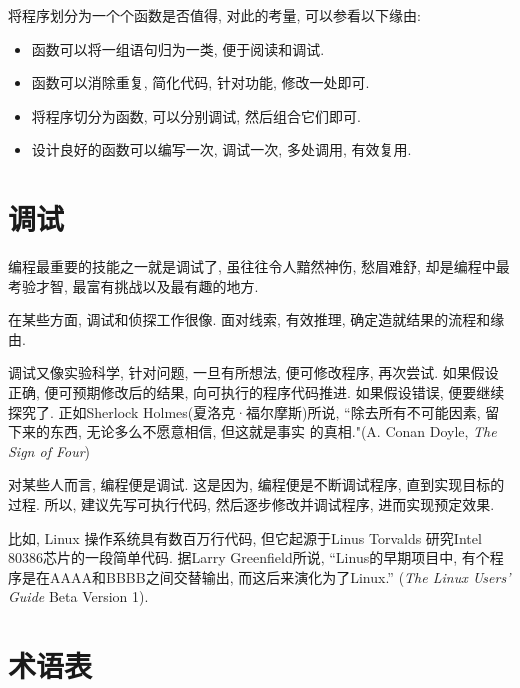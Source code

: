 \documentclass[10pt]{book}
\begin{document}
将程序划分为一个个函数是否值得, 对此的考量, 可以参看以下缘由:

\begin{itemize}

\item 函数可以将一组语句归为一类, 便于阅读和调试. 

\item 函数可以消除重复, 简化代码, 针对功能, 修改一处即可. 

\item 将程序切分为函数, 可以分别调试, 然后组合它们即可. 

\item 设计良好的函数可以编写一次, 调试一次, 多处调用, 有效复用. 

\end{itemize}


\section{调试}

编程最重要的技能之一就是调试了, 虽往往令人黯然神伤, 愁眉难舒, 
却是编程中最考验才智, 最富有挑战以及最有趣的地方.

在某些方面, 调试和侦探工作很像. 面对线索, 有效推理, 确定造就结果的流程和缘由. 

调试又像实验科学, 针对问题, 一旦有所想法, 便可修改程序, 再次尝试. 
如果假设正确, 便可预期修改后的结果, 向可执行的程序代码推进. 
如果假设错误, 便要继续探究了. 正如Sherlock Holmes(夏洛克·福尔摩斯)所说, 
``除去所有不可能因素, 留下来的东西, 无论多么不愿意相信, 但这就是事实
的真相."(A. Conan Doyle, {\em The Sign of Four})

对某些人而言, 编程便是调试. 这是因为, 编程便是不断调试程序, 直到实现目标的过程. 
所以, 建议先写可执行代码, 然后逐步修改并调试程序, 进而实现预定效果. 

比如, Linux 操作系统具有数百万行代码,  但它起源于Linus Torvalds
研究Intel 80386芯片的一段简单代码. 据Larry Greenfield所说, 
``Linus的早期项目中, 有个程序是在AAAA和BBBB之间交替输出, 而这后来演化为了Linux.''
({\em The Linux Users' Guide} Beta Version 1).


\section{术语表}
\end{document}
